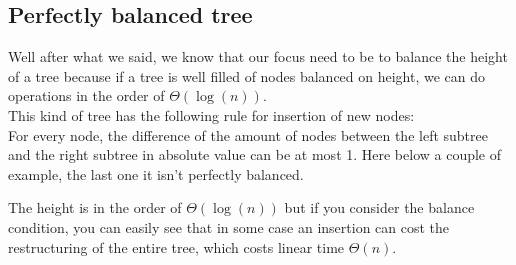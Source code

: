 \documentclass{article}
\begin{document}
\subsection{Perfectly balanced tree}
Well after what we said, we know that our focus need to be to balance the height of a tree because if a tree is well filled of nodes balanced on height, we can do operations in the order of $\Theta(\log(n))$.\\
This kind of tree has the following rule for insertion of new nodes:\\
For every node, the difference of the amount of nodes between the left subtree and the right subtree in absolute value can be at most 1. Here below a couple of example, the last one it isn't perfectly balanced.\\

The height is in the order of $\Theta(\log(n))$ but if you consider the balance condition, you can easily see that in some case an insertion can cost the restructuring of the entire tree, which costs linear time $\Theta(n)$.
\end{document}
